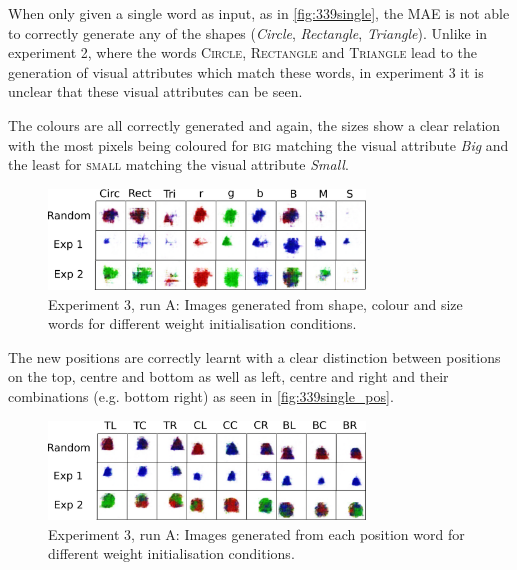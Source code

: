 When only given a single word as input, as in \autoref{fig:339single}, the MAE is not able to correctly generate any of the shapes (\textit{Circle}, \textit{Rectangle}, \textit{Triangle}). Unlike in experiment 2, where the words \textsc{Circle}, \textsc{Rectangle} and \textsc{Triangle} lead to the generation of visual attributes which match these words, in experiment 3 it is unclear that these visual attributes can be seen.

The colours are all correctly generated and again, the sizes show a clear relation with the most pixels being coloured for \textsc{big} matching the visual attribute \textit{Big} and the least for \textsc{small} matching the visual attribute \textit{Small}.

\begin{figure}[h]
\centering
\includegraphics[width=0.75\textwidth]{Figs/shapes/singlelabel339.png}
\caption{Experiment 3, run A: Images generated from shape, colour and size words for different weight initialisation conditions.}
\label{fig:339single}
\end{figure}

The new positions are correctly learnt with a clear distinction between positions on the top, centre and bottom as well as left, centre and right and their combinations (e.g. bottom right) as seen in \autoref{fig:339single_pos}.

\begin{figure}[h]
\centering
\includegraphics[width=0.75\textwidth]{Figs/shapes/singlelabel339_pos.png}
\caption{Experiment 3, run A: Images generated from each position word for different weight initialisation conditions.}
\label{fig:339single_pos}
\end{figure}


